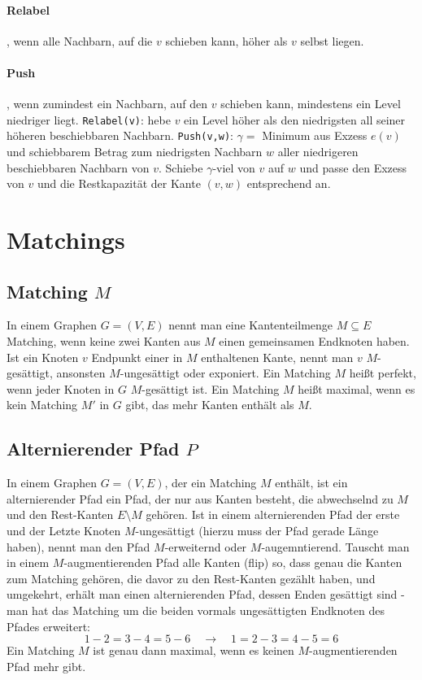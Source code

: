 \documentclass[10pt,a4paper,landscape]{article}
\begin{document}
\begin{multicols*}{2}
    \paragraph*{Relabel}, wenn alle Nachbarn, auf die $v$ schieben kann, höher als $v$ selbst liegen.
    \paragraph*{Push}, wenn zumindest ein Nachbarn, auf den $v$ schieben kann, mindestens ein Level niedriger liegt.
    \newline
    \verb|Relabel(v)|: hebe $v$ ein Level höher als den niedrigsten all seiner höheren beschiebbaren Nachbarn.
    \newline
    \verb|Push(v,w)|: $\gamma = $ Minimum aus Exzess $e(v)$ und schiebbarem Betrag zum niedrigsten Nachbarn $w$ aller niedrigeren beschiebbaren Nachbarn von $v$. 
    Schiebe $\gamma$-viel von $v$ auf $w$ und passe den Exzess von $v$ und die Restkapazität der Kante $(v,w)$ entsprechend an. 

\section{ Matchings }
    \subsection*{ Matching $M$ }
    In einem Graphen $G = (V,E)$ nennt man eine Kantenteilmenge $M \subseteq E$ Matching, wenn keine zwei Kanten aus $M$ einen gemeinsamen Endknoten haben. 
    Ist ein Knoten $v$ Endpunkt einer in $M$ enthaltenen Kante, nennt man $v$ $M$-gesättigt, ansonsten $M$-ungesättigt oder exponiert. 
    \newline
    Ein Matching $M$ heißt perfekt, wenn jeder Knoten in $G$ $M$-gesättigt ist. 
    \newline
    Ein Matching $M$ heißt maximal, wenn es kein Matching $M'$ in $G$ gibt, das mehr Kanten enthält als $M$.
    \subsection*{ Alternierender Pfad $P$ }
    In einem Graphen $G = (V,E)$, der ein Matching $M$ enthält, ist ein alternierender Pfad ein Pfad, der nur aus Kanten besteht, die abwechselnd zu $M$ und 
    den Rest-Kanten $E \setminus M$ gehören. Ist in einem alternierenden Pfad der erste und der Letzte Knoten $M$-ungesättigt (hierzu muss der Pfad gerade Länge haben), 
    nennt man den Pfad $M$-erweiternd oder $M$-augemntierend. Tauscht man in einem $M$-augmentierenden Pfad alle Kanten (flip) so, dass genau die Kanten zum 
    Matching gehören, die davor zu den Rest-Kanten gezählt haben, und umgekehrt, erhält man einen alternierenden Pfad, dessen Enden gesättigt sind - man hat 
    das Matching um die beiden vormals ungesättigten Endknoten des Pfades erweitert:
    \[ 1-2=3-4=5-6 \quad \rightarrow \quad 1=2-3=4-5=6 \]
    \newline
    Ein Matching $M$ ist genau dann maximal, wenn es keinen $M$-augmentierenden Pfad mehr gibt.

\end{multicols*}
\end{document}
